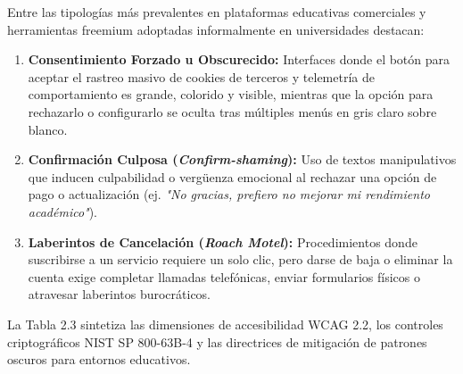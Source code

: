 Entre las tipologías más prevalentes en plataformas educativas comerciales y herramientas freemium adoptadas informalmente en universidades destacan:
\begin{enumerate}
    \item \textbf{Consentimiento Forzado u Obscurecido:} Interfaces donde el botón para aceptar el rastreo masivo de cookies de terceros y telemetría de comportamiento es grande, colorido y visible, mientras que la opción para rechazarlo o configurarlo se oculta tras múltiples menús en gris claro sobre blanco.
    \item \textbf{Confirmación Culposa (\textit{Confirm-shaming}):} Uso de textos manipulativos que inducen culpabilidad o vergüenza emocional al rechazar una opción de pago o actualización (ej. \textit{"No gracias, prefiero no mejorar mi rendimiento académico"}).
    \item \textbf{Laberintos de Cancelación (\textit{Roach Motel}):} Procedimientos donde suscribirse a un servicio requiere un solo clic, pero darse de baja o eliminar la cuenta exige completar llamadas telefónicas, enviar formularios físicos o atravesar laberintos burocráticos.
\end{enumerate}

La Tabla 2.3 sintetiza las dimensiones de accesibilidad WCAG 2.2, los controles criptográficos NIST SP 800-63B-4 y las directrices de mitigación de patrones oscuros para entornos educativos.

